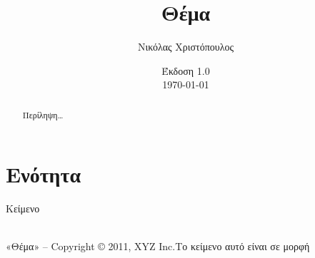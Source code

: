 \documentclass[10pt,a4paper]{article}
\def\DocTitle{Θέμα}
\def\DocAuthor{Νικόλας Χριστόπουλος}
\def\DocCopyr{XYZ Inc}
\def\DocVersion{1.0}
\def\q#1{«#1»}							%
\def\biblio#1#2#3#4{
\bibitem{#1}
\q{\textit{#2}}, #3,\\ #4\\
}
\begin{document}
\setlength{\parskip}{10pt}
\setlength{\parindent}{0pt}
\rm

\author{\DocAuthor}
\title{\DocTitle}
\date{Έκδοση \DocVersion\\ \today}
\maketitle

\begin{abstract}
Περίληψη{\ldots} 	
\end{abstract}

\tableofcontents

\section{Ενότητα}
Κείμενο


\label{EOF}
\hrulefill\\
{\footnotesize
\q{\DocTitle{}} -- Copyright \copyright{} 2011, \DocCopyr{}.\hfill{}Το κείμενο αυτό είναι σε μορφή \XeLaTeX
}
\end{document}
